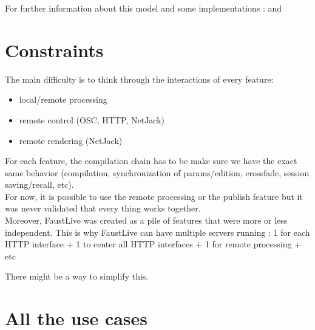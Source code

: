 \documentclass[a4paper]{article}
\begin{document}
For further information about this model and some implementations : \cite{CCC} and \cite{FaustLive} 





\newpage
\section{Constraints}\label{constraints}

The main difficulty is to think through the interactions of every feature:
\begin{itemize}
\item local/remote processing
\item remote control (OSC, HTTP, NetJack)
\item remote rendering (NetJack)
\end{itemize}

For each feature, the compilation chain has to be  make sure we have the exact same behavior (compilation, synchronization of params/edition, crossfade, session saving/recall, etc). \\

For now, it is possible to use the remote processing or the publish feature but it was never validated that every thing works together. \\

Moreover, FaustLive was created as a pile of features that were more or less independent. This is why FaustLive can have multiple servers running : 1 for each HTTP interface + 1 to center all HTTP interfaces + 1 for remote processing + etc

There might be a way to simplify this. 

\newpage
\section{All the use cases}

\end{document}
